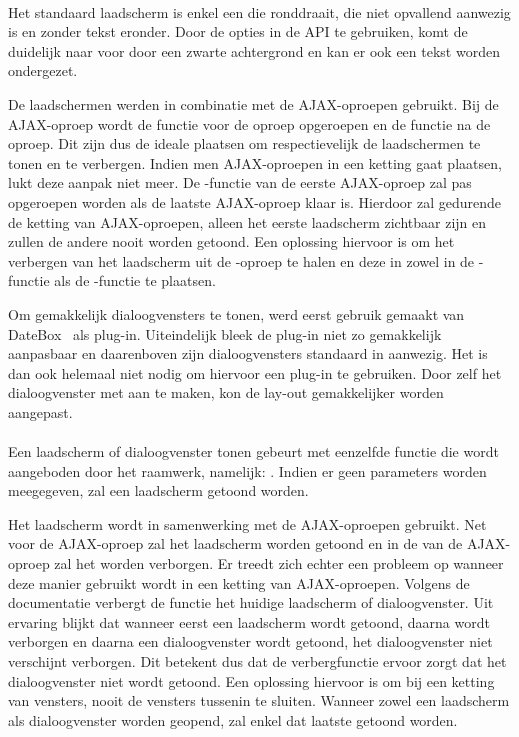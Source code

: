 \paragraph{\jqm}
Het standaard laadscherm is enkel een  die ronddraait, die niet opvallend aanwezig is en zonder tekst eronder.
Door de opties in de API te gebruiken, komt de  duidelijk naar voor door een zwarte achtergrond en kan er ook een tekst worden ondergezet.

De laadschermen werden in combinatie met de AJAX-oproepen gebruikt.
Bij de AJAX-oproep wordt de functie  voor de oproep opgeroepen en de functie  na de oproep.
Dit zijn dus de ideale plaatsen om respectievelijk de laadschermen te tonen en te verbergen.
Indien men AJAX-oproepen in een ketting gaat plaatsen, lukt deze aanpak niet meer.
De -functie van de eerste AJAX-oproep zal pas opgeroepen worden als de laatste AJAX-oproep klaar is.
Hierdoor zal gedurende de ketting van AJAX-oproepen, alleen het eerste laadscherm zichtbaar zijn en zullen de andere nooit worden getoond.
Een oplossing hiervoor is om het verbergen van het laadscherm uit de -oproep te halen en deze in zowel in de -functie als de -functie te plaatsen.

Om gemakkelijk dialoogvensters te tonen, werd eerst gebruik gemaakt van DateBox~\cite{Sage2013} als plug-in.
Uiteindelijk bleek de plug-in niet zo gemakkelijk aanpasbaar en daarenboven zijn dialoogvensters standaard in \jqm{} aanwezig.
Het is dan ook helemaal niet nodig om hiervoor een plug-in te gebruiken.
Door zelf het dialoogvenster met \jqm{} aan te maken, kon de lay-out gemakkelijker worden aangepast.

\paragraph{\lungo}
Een laadscherm of dialoogvenster tonen gebeurt met eenzelfde functie die wordt aangeboden door het raamwerk, namelijk: .
Indien er geen parameters worden meegegeven, zal een laadscherm getoond worden.

Het laadscherm wordt in samenwerking met de AJAX-oproepen gebruikt.
Net voor de AJAX-oproep zal het laadscherm worden getoond en in de  van de AJAX-oproep zal het worden verborgen.
Er treedt zich echter een probleem op wanneer deze manier gebruikt wordt in een ketting van AJAX-oproepen.
Volgens de documentatie verbergt de functie  het huidige laadscherm of dialoogvenster. 
Uit ervaring blijkt dat wanneer eerst een laadscherm wordt getoond, daarna wordt verborgen en daarna een dialoogvenster wordt getoond, het dialoogvenster niet verschijnt verborgen.
Dit betekent dus dat de verbergfunctie ervoor zorgt dat het dialoogvenster niet wordt getoond.
Een oplossing hiervoor is om bij een ketting van vensters, nooit de vensters tussenin te sluiten.
Wanneer zowel een laadscherm als dialoogvenster worden geopend, zal enkel dat laatste getoond worden.

